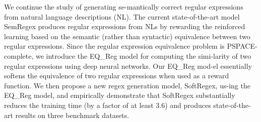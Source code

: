 We continue the study of generating se-mantically correct regular expressions from natural language descriptions (NL). The current state-of-the-art model SemRegex produces regular expressions from NLs by rewarding the reinforced learning based on the semantic (rather than syntactic) equivalence between two regular expressions. Since the regular expression equivalence problem is PSPACE-complete, we introduce the EQ\_Reg model for computing the simi-larity of two regular expressions using deep neural networks. Our EQ\_Reg mod-el essentially softens the equivalence of two regular expressions when used as a reward function. We then propose a new regex generation model, SoftRegex, us-ing the EQ\_Reg model, and empirically demonstrate that SoftRegex substantially reduces the training time (by a factor of at least 3.6) and produces state-of-the-art results on three benchmark datasets.